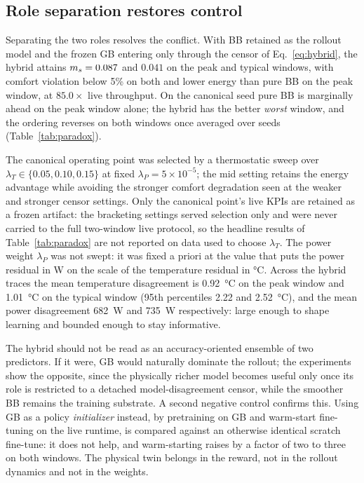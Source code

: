 \subsection{Role separation restores control}\label{sec:hybrid-recovery}

Separating the two roles resolves the conflict. With BB retained as the rollout model and the frozen
GB entering only through the censor of Eq.~\eqref{eq:hybrid}, the hybrid attains $m_s=0.087$ and
$0.041$ on the peak and typical windows, with comfort violation below 5\% on both and lower energy
than pure BB on the peak window, at $85.0\times$ live throughput. On the canonical seed pure BB is
marginally ahead on the peak window alone; the hybrid has the better \emph{worst} window, and the
ordering reverses on both windows once averaged over seeds (Table~\ref{tab:paradox}).

The canonical operating point was selected by a thermostatic sweep over
$\lambda_T\in\{0.05,0.10,0.15\}$ at fixed $\lambda_P=5\times10^{-5}$; the mid setting retains the
energy advantage while avoiding the stronger comfort degradation seen at the weaker and stronger
censor settings. Only the canonical point's live KPIs are retained as a frozen artifact: the
bracketing settings served selection only and were never carried to the full two-window live
protocol, so the headline results of Table~\ref{tab:paradox} are not reported on data used to choose
$\lambda_T$. The power weight $\lambda_P$ was not swept: it was fixed a priori at the value that puts the power
residual in \si{\watt} on the scale of the temperature residual in \si{\celsius}. Across the hybrid traces the mean temperature
disagreement is \SI{0.92}{\celsius} on the peak window and \SI{1.01}{\celsius} on the typical window
(95th percentiles 2.22 and \SI{2.52}{\celsius}), and the mean power disagreement \SI{682}{\watt} and
\SI{735}{\watt} respectively: large enough to shape learning and bounded enough to stay
informative.

The hybrid should not be read as an accuracy-oriented ensemble of two predictors. If it were, GB
would naturally dominate the rollout; the experiments show the opposite, since the physically richer
model becomes useful only once its role is restricted to a detached model-disagreement censor, while
the smoother BB remains the training substrate. A second negative control confirms this. Using GB as
a policy \emph{initializer} instead, by pretraining on GB and warm-start fine-tuning on the live
runtime, is compared against an otherwise identical scratch fine-tune: it does not help, and
warm-starting raises \ms{} by a factor of two to three on both windows. The physical twin belongs in
the reward, not in the rollout dynamics and not in the weights.


